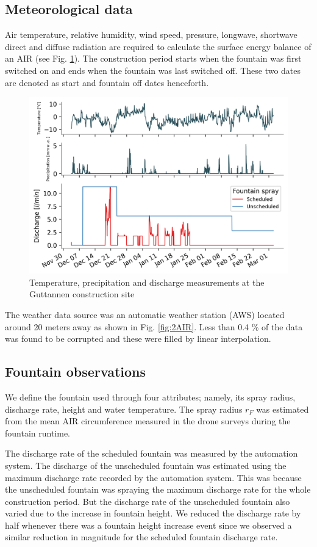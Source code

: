 \documentclass[tc, manuscript]{copernicus}
\begin{document}
\subsection{Meteorological data}
Air temperature, relative humidity, wind speed, pressure, longwave, shortwave direct and diffuse radiation are
required to calculate the surface energy balance of an AIR (see Fig. \ref{fig:aws}). The construction period starts when the
fountain was first switched on and ends when the fountain was last switched off. These two dates are denoted as
start and fountain off dates henceforth.

\begin{figure}[t]
\includegraphics[width=12cm]{Figures/data.png}
\caption{Temperature, precipitation and discharge measurements at the Guttannen construction site}
\label{fig:aws} 
\end{figure}

The weather data source was an automatic weather station (AWS) located around 20 meters away as shown in Fig.
\ref{fig:2AIR}. Less than 0.4 \% of the data was found to be corrupted and these were filled by linear
interpolation. 

\subsection{Fountain observations}

We define the fountain used through four attributes; namely, its spray radius, discharge rate, height and water
temperature. The spray radius $r_F$ was estimated from the mean AIR circumference
measured in the drone surveys during the fountain runtime. 

The discharge rate of the scheduled fountain was measured by the automation system. The discharge of the
unscheduled fountain was estimated using the maximum discharge rate recorded by the automation system. This was
because the unscheduled fountain was spraying the maximum discharge rate for the whole construction period. But
the discharge rate of the unscheduled fountain also varied due to the increase in fountain height. We reduced
the discharge rate by half whenever there was a fountain height increase event since we observed a similar
reduction in magnitude for the scheduled fountain discharge rate.
\end{document}
